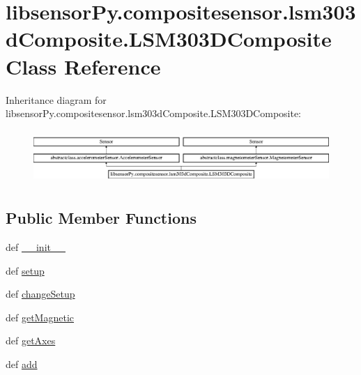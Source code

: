\hypertarget{classlibsensorPy_1_1compositesensor_1_1lsm303dComposite_1_1LSM303DComposite}{}\section{libsensor\+Py.\+compositesensor.\+lsm303d\+Composite.\+L\+S\+M303\+D\+Composite Class Reference}
\label{classlibsensorPy_1_1compositesensor_1_1lsm303dComposite_1_1LSM303DComposite}
Inheritance diagram for libsensor\+Py.\+compositesensor.\+lsm303d\+Composite.\+L\+S\+M303\+D\+Composite\+:\begin{figure}[H]
\begin{center}
\leavevmode
\includegraphics[height=2.048780cm]{classlibsensorPy_1_1compositesensor_1_1lsm303dComposite_1_1LSM303DComposite}
\end{center}
\end{figure}
\subsection*{Public Member Functions}
\begin{DoxyCompactItemize}
\item 
def \hyperlink{classlibsensorPy_1_1compositesensor_1_1lsm303dComposite_1_1LSM303DComposite_a390aae32aa96fcb0478225345d8a4907}{\+\_\+\+\_\+init\+\_\+\+\_\+}
\item 
def \hyperlink{classlibsensorPy_1_1compositesensor_1_1lsm303dComposite_1_1LSM303DComposite_ac7b8af34471ec60fdfef52ddb352e4ad}{setup}
\item 
def \hyperlink{classlibsensorPy_1_1compositesensor_1_1lsm303dComposite_1_1LSM303DComposite_a61640ae64ea5f9de1b01406462e195ef}{change\+Setup}
\item 
def \hyperlink{classlibsensorPy_1_1compositesensor_1_1lsm303dComposite_1_1LSM303DComposite_a1b4b0cefc2aa7507cb9a78116b66d796}{get\+Magnetic}
\item 
def \hyperlink{classlibsensorPy_1_1compositesensor_1_1lsm303dComposite_1_1LSM303DComposite_a833bff2ce6a36d07544e774187b36fb7}{get\+Axes}
\item 
def \hyperlink{classlibsensorPy_1_1compositesensor_1_1lsm303dComposite_1_1LSM303DComposite_aa8978be3810f0a36fb8c687cc05ca2c8}{add}
\end{DoxyCompactItemize}
